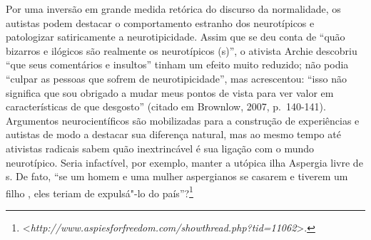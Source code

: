 Por uma inversão em grande medida retórica do discurso da normalidade, os
autistas podem destacar o comportamento estranho dos neurotípicos e
patologizar satiricamente a neurotipicidade. Assim que se deu conta de
``quão bizarros e ilógicos são realmente os neurotípicos (s)'', o
ativista Archie descobriu ``que seus comentários e insultos'' tinham um
efeito muito reduzido; não podia ``culpar as pessoas que sofrem de
neurotipicidade'', mas acrescentou: ``isso não significa que sou
obrigado a mudar meus pontos de vista para ver valor em características
de que desgosto'' (citado em Brownlow, 2007, p.~140-141). Argumentos
neurocientíficos são mobilizadas para a construção de experiências  e
autistas de modo a destacar sua diferença natural, mas ao mesmo tempo
até ativistas radicais sabem quão inextrincável é sua ligação com o
mundo neurotípico. Seria infactível, por exemplo, manter a utópica ilha
Aspergia livre de s. De fato, ``se um homem e uma mulher aspergianos
se casarem e tiverem um filho , eles teriam de expulsá"-lo do
país''?\footnote[28]{\textless{}\emph{http://www.aspiesforfreedom.com/showthread.php?tid=11062}\textgreater{}.}

